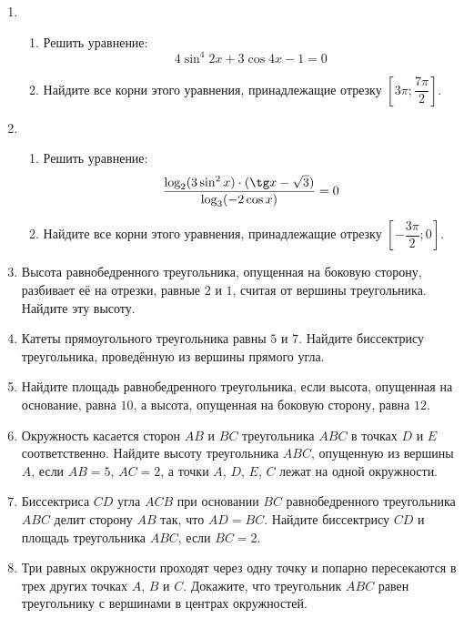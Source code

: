 \documentclass[12pt, a4paper]{article}
\begin{document}
	   \cfoot{}
	\begin{enumerate}[label=\textbf{\arabic*.}]
		\item 
		\begin{enumerate}[label=\asbuk*)]
			\item Решить уравнение: \[ 4\sin^4 2x + 3\cos 4x - 1 = 0 \]
			\item Найдите все корни этого уравнения, принадлежащие отрезку \( \left[3\pi;\dfrac{7\pi}{2}\right] \).
		\end{enumerate}
		\item 
		\begin{enumerate}[label=\asbuk*)]
			\item Решить уравнение: \[ \dfrac{\log_2(3\sin^2x)\cdot(\tg x -\sqrt{3})}{\log_3(-2\cos x)}=0 \]
			\item Найдите все корни этого уравнения, принадлежащие отрезку \( \left[-\dfrac{3\pi}{2};0\right] \).
		\end{enumerate}
		
		\item Высота равнобедренного треугольника, опущенная на боковую сторону, разбивает её на отрезки, равные \( 2 \) и \( 1 \), считая от вершины треугольника. Найдите эту высоту.
		
		\item Катеты прямоугольного треугольника равны \( 5 \) и \( 7 \). Найдите биссектрису треугольника, проведённую из вершины прямого угла.
		
		\item Найдите площадь равнобедренного треугольника, если высота, опущенная на основание, равна \( 10 \), а высота, опущенная на боковую сторону, равна \( 12 \).
		
		\item Окружность касается сторон \( AB \) и \( BC \) треугольника \( ABC \)
		в точках \( D \) и \( E \) соответственно. Найдите высоту треугольника \( ABC \),
		опущенную из вершины \( A \), если \( AB = 5 \), \( AC = 2 \), а точки \( A \), \( D \), \( E \), \( C \) лежат на одной окружности.
		
		\item Биссектриса \( CD \) угла \( ACB \) при основании \( BC \) равнобедренного треугольника \( ABC \) делит сторону \( AB \) так, что \( AD = BC \). Найдите биссектрису \( CD \) и площадь треугольника \( ABC \), если \( BC = 2 \).
		
		\item Три равных окружности проходят через одну точку и попарно пересекаются в трех других точках \( A \), \( B \) и \( C \). Докажите, что треугольник \( ABC \) равен треугольнику с вершинами в центрах окружностей.
		

\end{enumerate}
\end{document}

